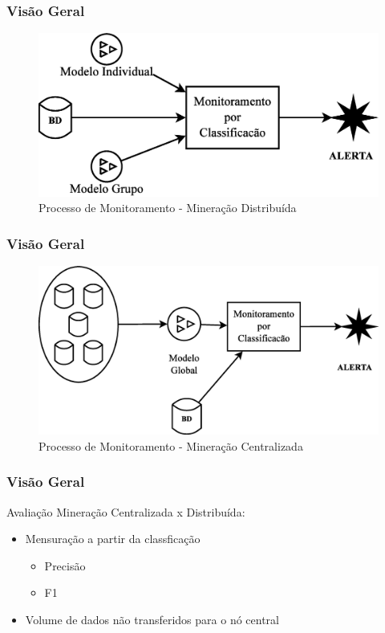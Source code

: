 \documentclass[hyperref={pdfpagelabels=false}]{beamer}
\begin{document}
\begin{frame}
	\frametitle{Visão Geral}
    \begin{figure}
		\centering
	    \includegraphics[scale=0.30]{img/VisaoGeral-05}
  		\caption{\scriptsize{Processo de Monitoramento - Mineração Distribuída}}
   	\end{figure}
\end{frame}

\begin{frame}
	\frametitle{Visão Geral}
    \begin{figure}
		\centering
	    \includegraphics[scale=0.30]{img/VisaoGeral-06}
  		\caption{\scriptsize{Processo de Monitoramento - Mineração Centralizada}}
   	\end{figure}
\end{frame}


\begin{frame}
	\frametitle{Visão Geral}
    Avaliação Mineração Centralizada x Distribuída: \begin{itemize}
	    \item Mensuração a partir da classficação \begin{itemize}
	  	  \item Precisão
          \item F1
	    \end{itemize} 
        \item Volume de dados não transferidos para o nó central
	\end{itemize}
    
\end{frame}
       
\end{document}
